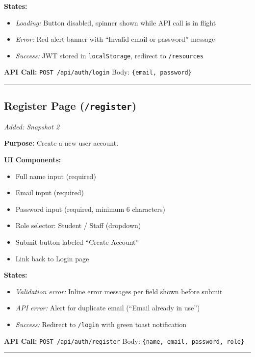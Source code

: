 \documentclass[12pt]{article}
\begin{document}
\textbf{States:}
\begin{itemize}
    \item \textit{Loading:} Button disabled, spinner shown while API call is in flight
    \item \textit{Error:} Red alert banner with ``Invalid email or password'' message
    \item \textit{Success:} JWT stored in \texttt{localStorage}, redirect to \texttt{/resources}
\end{itemize}

\textbf{API Call:} \texttt{POST /api/auth/login} \quad Body: \texttt{\{email, password\}}

\hrule\vspace{1em}

\subsection{Register Page (\texttt{/register})}
\textit{Added: Snapshot 2}

\textbf{Purpose:} Create a new user account.

\textbf{UI Components:}
\begin{itemize}
    \item Full name input (required)
    \item Email input (required)
    \item Password input (required, minimum 6 characters)
    \item Role selector: Student / Staff (dropdown)
    \item Submit button labeled ``Create Account''
    \item Link back to Login page
\end{itemize}

\textbf{States:}
\begin{itemize}
    \item \textit{Validation error:} Inline error messages per field shown before submit
    \item \textit{API error:} Alert for duplicate email (``Email already in use'')
    \item \textit{Success:} Redirect to \texttt{/login} with green toast notification
\end{itemize}

\textbf{API Call:} \texttt{POST /api/auth/register} \quad Body: \texttt{\{name, email, password, role\}}

\hrule\vspace{1em}
\end{document}
